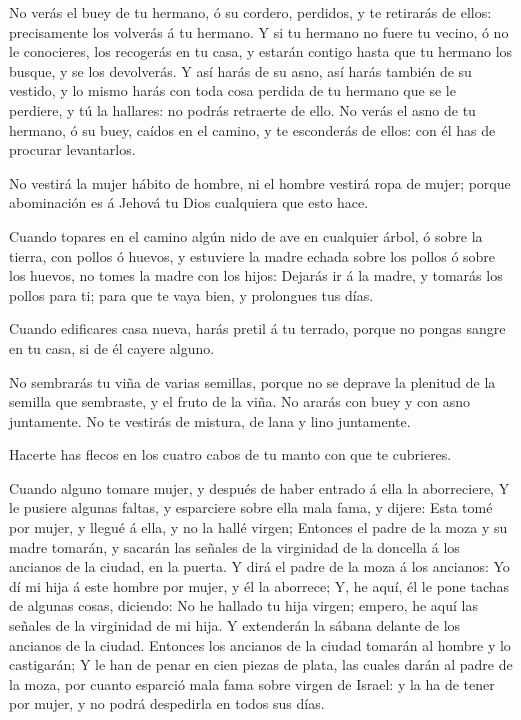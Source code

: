  No verás el buey de tu hermano, ó su cordero, perdidos, y
te retirarás de ellos: precisamente los volverás á tu hermano.
 Y si tu hermano no fuere tu vecino, ó no le conocieres, los
recogerás en tu casa, y estarán contigo hasta que tu hermano los busque,
y se los devolverás.  Y así harás de su asno, así harás
también de su vestido, y lo mismo harás con toda cosa perdida de tu
hermano que se le perdiere, y tú la hallares: no podrás retraerte de
ello.  No verás el asno de tu hermano, ó su buey, caídos en
el camino, y te esconderás de ellos: con él has de procurar levantarlos.

 No vestirá la mujer hábito de hombre, ni el hombre vestirá
ropa de mujer; porque abominación es á Jehová tu Dios cualquiera que
esto hace.

 Cuando topares en el camino algún nido de ave en cualquier
árbol, ó sobre la tierra, con pollos ó huevos, y estuviere la madre
echada sobre los pollos ó sobre los huevos, no tomes la madre con los
hijos:  Dejarás ir á la madre, y tomarás los pollos para ti;
para que te vaya bien, y prolongues tus días.

 Cuando edificares casa nueva, harás pretil á tu terrado,
porque no pongas sangre en tu casa, si de él cayere alguno.

 No sembrarás tu viña de varias semillas, porque no se
deprave la plenitud de la semilla que sembraste, y el fruto de la viña.
 No ararás con buey y con asno juntamente.  No
te vestirás de mistura, de lana y lino juntamente.

 Hacerte has flecos en los cuatro cabos de tu manto con que
te cubrieres.

 Cuando alguno tomare mujer, y después de haber entrado á
ella la aborreciere,  Y le pusiere algunas faltas, y
esparciere sobre ella mala fama, y dijere: Esta tomé por mujer, y llegué
á ella, y no la hallé virgen;  Entonces el padre de la moza
y su madre tomarán, y sacarán las señales de la virginidad de la
doncella á los ancianos de la ciudad, en la puerta.  Y dirá
el padre de la moza á los ancianos: Yo dí mi hija á este hombre por
mujer, y él la aborrece;  Y, he aquí, él le pone tachas de
algunas cosas, diciendo: No he hallado tu hija virgen; empero, he aquí
las señales de la virginidad de mi hija. Y extenderán la sábana delante
de los ancianos de la ciudad.  Entonces los ancianos de la
ciudad tomarán al hombre y lo castigarán;  Y le han de
penar en cien piezas de plata, las cuales darán al padre de la moza, por
cuanto esparció mala fama sobre virgen de Israel: y la ha de tener por
mujer, y no podrá despedirla en todos sus días.

